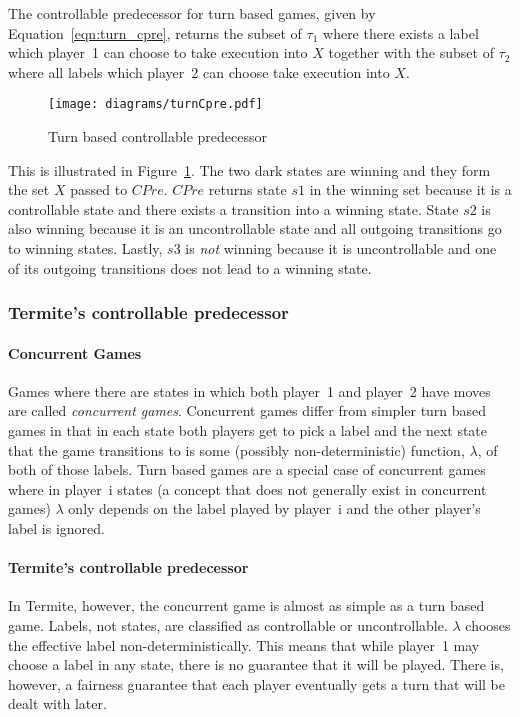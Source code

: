 The controllable predecessor for turn based games, given by Equation~\ref{eqn:turn_cpre}, returns the subset of $\tau_1$ where there exists a label which player~1 can choose to take execution into $X$ together with the subset of $\tau_2$ where all labels which player~2 can choose take execution into $X$. 

\begin{figure}[t]
\centering
\texttt{[image: diagrams/turnCpre.pdf]}
\caption{Turn based controllable predecessor}
\label{fig:turn_cpre}
\end{figure}

This is illustrated in Figure~\ref{fig:turn_cpre}. The two dark states are winning and they form the set $X$ passed to $CPre$. $CPre$ returns state $s1$ in the winning set because it is a controllable state and there exists a transition into a winning state. State $s2$ is also winning because it is an uncontrollable state and all outgoing transitions go to winning states. Lastly, $s3$ is \emph{not} winning because it is uncontrollable and one of its outgoing transitions does not lead to a winning state.

\subsubsection{Termite's controllable predecessor}
\label{sec:termite_cpre}

\paragraph{Concurrent Games}

Games where there are states in which both player~1 and player~2 have moves are called \emph{concurrent games}. Concurrent games differ from simpler turn based games in that in each state both players get to pick a label and the next state that the game transitions to is some (possibly non-deterministic) function, $\lambda$, of both of those labels. Turn based games are a special case of concurrent games where in player~i states (a concept that does not generally exist in concurrent games) $\lambda$ only depends on the label played by player~i and the other player's label is ignored. 

\paragraph{Termite's controllable predecessor}

In Termite, however, the concurrent game is almost as simple as a turn based game. Labels, not states, are classified as controllable or uncontrollable. $\lambda$ chooses the effective label non-deterministically. This means that while player~1 may choose a label in any state, there is no guarantee that it will be played. There is, however, a fairness guarantee that each player eventually gets a turn that will be dealt with later.

